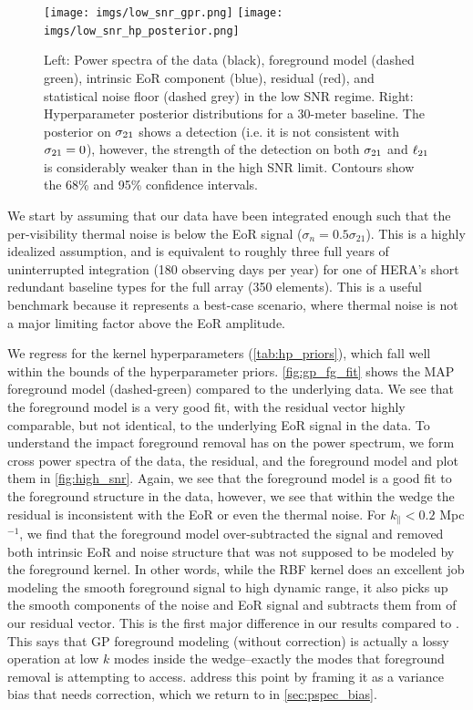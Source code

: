 \documentclass[a4paper,fleqn,usenatbib]{mnras}
\def\para{\parallel}
\def\sigmato{\sigma_{\rm 21}}
\def\ellto{\ell_{\rm 21}}
\begin{document}
\begin{figure}
\centering
\texttt{[image: imgs/low\_snr\_gpr.png]}
\texttt{[image: imgs/low\_snr\_hp\_posterior.png]}
\caption{Left: Power spectra of the data (black), foreground model (dashed green), intrinsic EoR component (blue), residual (red), and statistical noise floor (dashed grey) in the low SNR regime. Right: Hyperparameter posterior distributions for a 30-meter baseline. The posterior on $\sigmato$ shows a detection (i.e. it is not consistent with $\sigmato=0$), however, the strength of the detection on both $\sigmato$ and $\ellto$ is considerably weaker than in the high SNR limit. Contours show the 68\% and 95\% confidence intervals.}
\label{fig:low_snr}
\end{figure}

We start by assuming that our data have been integrated enough such that the per-visibility thermal noise is below the EoR signal ($\sigma_n = 0.5 \sigma_{21}$).
This is a highly idealized assumption, and is equivalent to roughly three full years of uninterrupted integration (180 observing days per year) for one of HERA's short redundant baseline types for the full array (350 elements).
This is a useful benchmark because it represents a best-case scenario, where thermal noise is not a major limiting factor above the EoR amplitude.

We regress for the kernel hyperparameters (\autoref{tab:hp_priors}), which fall well within the bounds of the hyperparameter priors.
\autoref{fig:gp_fg_fit} shows the MAP foreground model (dashed-green) compared to the underlying data.
We see that the foreground model is a very good fit, with the residual vector highly comparable, but not identical, to the underlying EoR signal in the data.
To understand the impact foreground removal has on the power spectrum, we form cross power spectra of the data, the residual, and the foreground model and plot them in \autoref{fig:high_snr}.
Again, we see that the foreground model is a good fit to the foreground structure in the data, however, we see that within the wedge the residual is inconsistent with the EoR or even the thermal noise.
For $k_\para < 0.2$ Mpc$^{-1}$, we find that the foreground model over-subtracted the signal and removed both intrinsic EoR and noise structure that was not supposed to be modeled by the foreground kernel.
In other words, while the RBF kernel does an excellent job modeling the smooth foreground signal to high dynamic range, it also picks up the smooth components of the noise and EoR signal and subtracts them from of our residual vector.
This is the first major difference in our results compared to .
This says that GP foreground modeling (without correction) is actually a lossy operation at low $k$ modes inside the wedge--exactly the modes that foreground removal is attempting to access.
 address this point by framing it as a variance bias that needs correction, which we return to in \autoref{sec:pspec_bias}.
\end{document}
